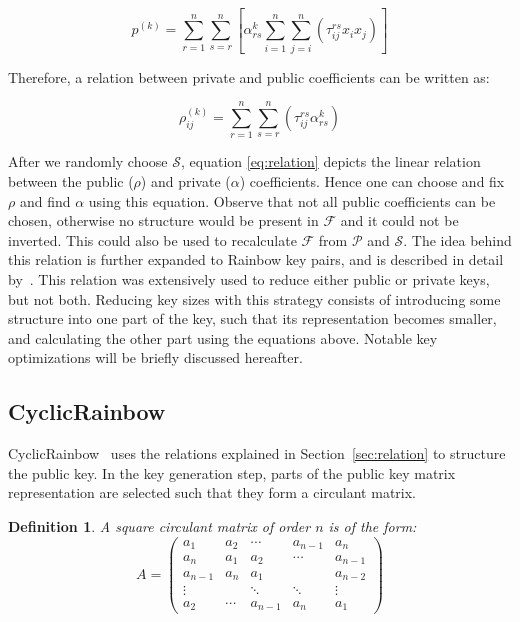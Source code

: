 \documentclass{ufsctex/ufsctex}
\newtheorem{definition}{Definition}
\begin{document}
\begin{equation}
p^{(k)} = \sum_{r=1}^n \sum_{s=r}^n
\left[
\alpha^{k}_{rs} \sum_{i=1}^{n}\sum_{j=i}^n \left( \tau^{rs}_{ij} x_i x_j \right)
\right]
\end{equation}

Therefore, a relation between private and public coefficients can be written as:

\begin{equation}\label{eq:relation}
\rho^{(k)}_{ij} = \sum_{r=1}^{n}\sum_{s=r}^n
\left( \tau^{rs}_{ij} \alpha^{k}_{rs} \right)
\end{equation}

After we randomly choose $\mathcal{S}$, equation \ref{eq:relation} depicts the
linear relation between the public ($\rho$) and private ($\alpha$)
coefficients. Hence one can choose and fix $\rho$ and find $\alpha$ using this
equation. Observe that not all public coefficients can be chosen, otherwise no
structure would be present in $\mathcal{F}$ and it could not be inverted. This
could also be used to recalculate $\mathcal{F}$ from $\mathcal{P}$ and
$\mathcal{S}$. The idea behind this relation is further expanded to Rainbow key
pairs, and is described in detail by~\cite{petzoldt2011small}. This relation
was extensively used to reduce either public or private keys, but not both.
Reducing key sizes with this strategy consists of introducing some structure
into one part of the key, such that its representation becomes smaller, and
calculating the other part using the equations above. Notable key optimizations
will be briefly discussed hereafter.



\subsection{CyclicRainbow}

CyclicRainbow~\cite{petzoldt2010cyclicrainbow} uses the relations explained in
Section~\ref{sec:relation} to structure the public key. In the key generation
step, parts of the public key matrix representation are selected such that they
form a circulant matrix.

\begin{definition}
A square circulant matrix of order $n$ is of the form:
\begin{equation}
A =
\begin{pmatrix}
a_1     & a_2    & \cdots  & a_{n-1} & a_n     \\
a_n     & a_1    & a_2     & \cdots  & a_{n-1} \\
a_{n-1} & a_n    & a_1     &         & a_{n-2} \\
\vdots  &        & \ddots  & \ddots  & \vdots  \\
a_2     & \cdots & a_{n-1} & a_n     & a_1
\end{pmatrix}
\end{equation}
\end{definition}
\end{document}
